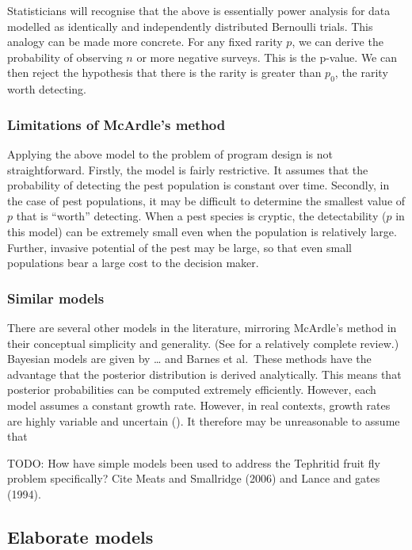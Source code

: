 \documentclass[
]{book}
\begin{document}
Statisticians will recognise that the above is essentially power analysis for data modelled as identically and independently distributed Bernoulli trials. This analogy can be made more concrete. For any fixed rarity \(p\), we can derive the probability of observing \(n\) or more negative surveys. This is the p-value. We can then reject the hypothesis that there is the rarity is greater than \(p_0\), the rarity worth detecting.

\hypertarget{limitations-of-mcardles-method}{%
\subsubsection{Limitations of McArdle's method}\label{limitations-of-mcardles-method}}

Applying the above model to the problem of program design is not straightforward. Firstly, the model is fairly restrictive. It assumes that the probability of detecting the pest population is constant over time. Secondly, in the case of pest populations, it may be difficult to determine the smallest value of \(p\) that is ``worth'' detecting. When a pest species is cryptic, the detectability (\(p\) in this model) can be extremely small even when the population is relatively large. Further, invasive potential of the pest may be large, so that even small populations bear a large cost to the decision maker.

\hypertarget{similar-models}{%
\subsubsection{Similar models}\label{similar-models}}

There are several other models in the literature, mirroring McArdle's method in their conceptual simplicity and generality. (See \citet{boakes2015} for a relatively complete review.) Bayesian models are given by \ldots{} and Barnes et al.~These methods have the advantage that the posterior distribution is derived analytically. This means that posterior probabilities can be computed extremely efficiently. However, each model assumes a constant growth rate. However, in real contexts, growth rates are highly variable and uncertain (\citet{caley2014}). It therefore may be unreasonable to assume that

TODO: How have simple models been used to address the Tephritid fruit fly problem specifically? Cite Meats and Smallridge (2006) and Lance and gates (1994).

\hypertarget{elaborate-models}{%
\subsection{Elaborate models}\label{elaborate-models}}
\end{document}

